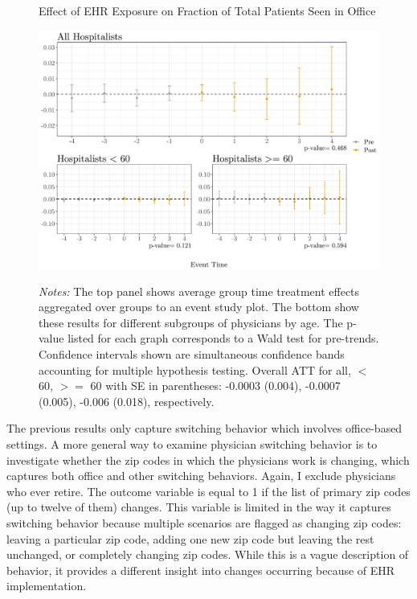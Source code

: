 \documentclass[11pt]{article}
\begin{document}
\begin{figure}[ht]
    \centering
    \captionsetup{width=.85\linewidth}
    \caption{Effect of EHR Exposure on Fraction of Total Patients Seen in Office}
    \includegraphics[scale=.65]{Objects/officefrac_plot.pdf}
    \label{fig:officesecond}
    \vspace{2mm}
    \caption*{\footnotesize{\textit{Notes:} The top panel shows average group time treatment effects aggregated over groups to an event study plot. The bottom show these results for different subgroups of physicians by age. The p-value listed for each graph corresponds to a Wald test for pre-trends. Confidence intervals shown are simultaneous confidence bands accounting for multiple hypothesis testing. Overall ATT for all, $<$ 60, $>=$ 60 with SE in parentheses: -0.0003 (0.004), -0.0007 (0.005), -0.006 (0.018), respectively.}}
\end{figure}

The previous results only capture switching behavior which involves office-based settings. A more general way to examine physician switching behavior is to investigate whether the zip codes in which the physicians work is changing, which captures both office and other switching behaviors. Again, I exclude physicians who ever retire. The outcome variable is equal to 1 if the list of primary zip codes (up to twelve of them) changes. This variable is limited in the way it captures switching behavior because multiple scenarios are flagged as changing zip codes: leaving a particular zip code, adding one new zip code but leaving the rest unchanged, or completely changing zip codes. While this is a vague description of behavior, it provides a different insight into changes occurring because of EHR implementation.
\end{document}
